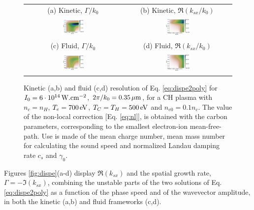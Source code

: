 \documentclass[
 reprint,
 superscriptaddress,
 amsmath,amssymb,
 aps,
]{revtex4-1}
\begin{document}
\begin{figure}
\begin{tabular}{cc}
(a) Kinetic, $\Gamma/k_0$ &
(b)  Kinetic, $\Re(k_{sx}/k_0)$ \\
\includegraphics[width=0.24\textwidth]{2a.png}&
\includegraphics[width=0.24\textwidth]{2b.png}\\
(c) Fluid, $\Gamma/k_0$  &
(d) Fluid, $\Re(k_{sx}/k_0)$  \\
\includegraphics[width=0.24\textwidth]{2c.png}&
\includegraphics[width=0.24\textwidth]{2d.png}
\end{tabular}
\caption{ \label{fig:dispeCH}  
Kinetic (a,b) and fluid (c,d) resolution of Eq. \eqref{eq:dispe2poly} for  $I_0 = 6\cdot 10^{14}\, \rm W.cm^{-2}$, $2\pi/k_0=0.35 \,\rm\mu m$, for a CH plasma with $n_c=n_H$, $T_e =700\,\rm  eV$, $T_C=T_H =500\,  \rm eV$ and $n_{e0}=0.1n_c$. The value of the non-local correction [Eq. \eqref{eq:nl}], is obtained with the carbon parameters, corresponding to the smallest electron-ion mean-free-path. Use is made of the mean charge number, mean mass number   for calculating the sound speed and normalized Landau damping rate $c_s$ and $\gamma_0$.
 }
\end{figure}
Figures \ref{fig:dispe}(a-d) display  $\Re(k_{sx})$ and the spatial growth rate,  $\Gamma=-\Im(k_{sx})$, combining   the  unstable parts of the two  solutions of Eq. \eqref{eq:dispe2poly} as a function of the phase speed and of the wavevector amplitude, in both the kinetic (a,b) and fluid frameworks (c,d).
\end{document}
